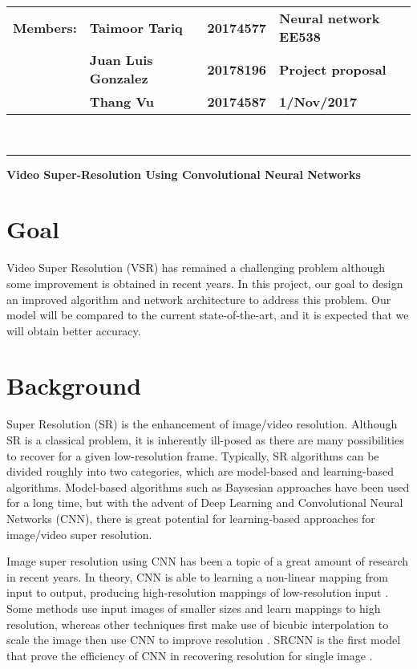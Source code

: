 \documentclass[10pt]{article}
\begin{document}
\noindent
\begin{tabular}{lll R{8.0cm}}
\textbf{Members:} & \textbf{Taimoor Tariq}      & \textbf{20174577} & \textbf{Neural network EE538}\\
\textbf{}         & \textbf{Juan Luis Gonzalez} & \textbf{20178196} & \textbf{Project proposal}\\
\textbf{}         & \textbf{Thang Vu}           & \textbf{20174587} & \textbf{1/Nov/2017}
\end{tabular}\\
\rule[2ex]{\textwidth}{2pt}

{\Large\centerline{\textbf{Video Super-Resolution Using Convolutional Neural Networks}}}

\section{Goal} %
\label{sec:goal}
Video Super Resolution (VSR) has remained a challenging problem although some improvement is obtained in recent years. In this project, our goal to design an improved algorithm and network architecture to address this problem. Our model will be compared to the current state-of-the-art, and it is expected that we will obtain better accuracy. 

\section{Background} %
\label{sec:background}
Super Resolution (SR) is the enhancement of image/video resolution. Although SR is a classical problem, it is inherently ill-posed as there are many possibilities to recover for a given low-resolution frame. Typically, SR algorithms can be divided roughly into two categories, which are model-based and learning-based algorithms. Model-based algorithms such as Baysesian approaches have been used for a long time, but with the advent of Deep Learning and Convolutional Neural Networks (CNN), there is great potential for learning-based approaches for image/video super resolution.

Image super resolution using CNN has been a topic of a great amount of research in recent years. In theory, CNN is able to learning a non-linear mapping from input to output, producing high-resolution mappings of low-resolution input \cite{dong2016image}. Some methods use input images of smaller sizes and learn mappings to high resolution, whereas other techniques first make use of bicubic interpolation to scale the image then use CNN to improve resolution \cite{dong2016image}. SRCNN is the first model that prove the efficiency of CNN in recovering resolution for single image \cite{dong2016image}. 







\end{document}
